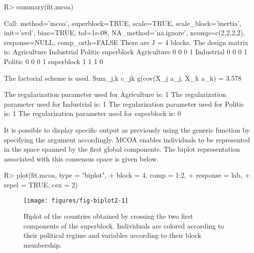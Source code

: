 \documentclass[
]{jss}
\begin{document}
\begin{CodeChunk}
\begin{CodeInput}
R> summary(fit.mcoa)
\end{CodeInput}
\begin{CodeOutput}
Call: method='mcoa', superblock=TRUE, scale=TRUE, scale_block='inertia', init='svd',
bias=TRUE, tol=1e-08, NA_method='na.ignore', ncomp=c(2,2,2,2), response=NULL,
comp_orth=FALSE 
There are J = 4 blocks.
The design matrix is:
            Agriculture Industrial Politic superblock
Agriculture           0          0       0          1
Industrial            0          0       0          1
Politic               0          0       0          1
superblock            1          1       1          0

The factorial scheme is used.
Sum_{j,k} c_jk g(cov(X_j a_j, X_k a_k) = 3.578 

The regularization parameter used for Agriculture is: 1
The regularization parameter used for Industrial is: 1
The regularization parameter used for Politic is: 1
The regularization parameter used for superblock is: 0
\end{CodeOutput}
\end{CodeChunk}

\normalsize

It is possible to display specific output as previously using the
generic  function by specifying the argument 
accordingly. MCOA enables individuals to be represented in the space
spanned by the first global components. The biplot representation
associated with this consensus space is given below.

\footnotesize

\begin{CodeChunk}
\begin{CodeInput}
R> plot(fit.mcoa, type = "biplot", 
+      block = 4, comp = 1:2, 
+      response = lab, 
+      repel = TRUE, cex = 2)
\end{CodeInput}
\begin{figure}[H]

{\centering \texttt{[image: figures/fig-biplot2-1]} 

}

\caption[Biplot of the countries obtained by crossing the two first components of the superblock]{Biplot of the countries obtained by crossing the two first components of the superblock. Individuals are colored according to their political regime and variables according to their block membership.}\label{fig:fig-biplot2}
\end{figure}
\end{CodeChunk}
\end{document}
